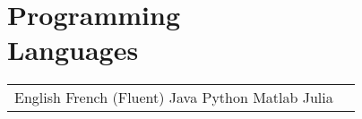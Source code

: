 \documentclass[margin,line,pifont,palatino,courier]{res}
\newenvironment{list1}{
  \begin{list}{\label{ } }{
      \setlength{\itemsep}{0in}
      \setlength{\parsep}{0in} \setlength{\parskip}{0in}
      \setlength{\topsep}{0in} \setlength{\partopsep}{0in}
      \setlength{\leftmargin}{0.0in} } }{\end{list} }
\begin{document}
\begin{resume}
\begin{list1}
          
    

  \end{list1}


\section{\sc Programming\\ Languages}

  \begin{tabular}{@{}p{6in}p{3in}}

     English  French (Fluent)  Java  Python  Matlab  Julia 

  \end{tabular}



\end{resume}
\end{document}
